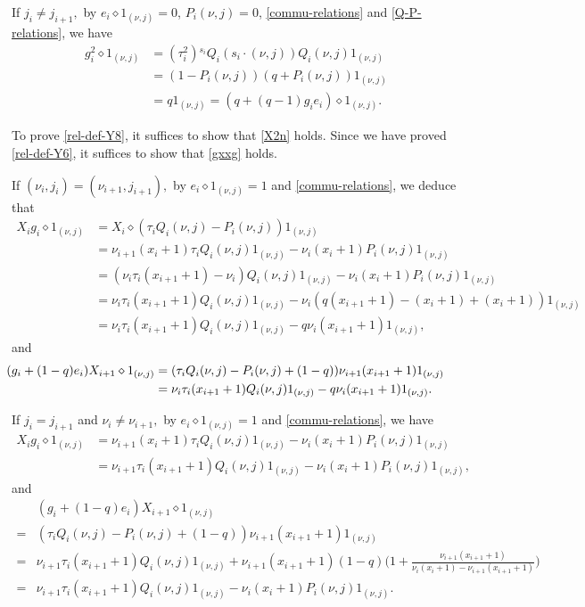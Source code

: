 \documentclass[11pt, reqno]{amsart} \textwidth=14.9cm \oddsidemargin=1cm \evensidemargin=1cm
\theoremstyle{definition}
\numberwithin{equation}{section}
\begin{document}
If $j_{i}\neq j_{i+1},$ by $e_{i}\diamond 1_{(\nu, j)}=0$, $P_{i}(\nu, j)=0$, \eqref{commu-relations} and \eqref{Q-P-relations}, we have
\begin{align*}
g_{i}^{2}\diamond 1_{(\nu, j)}&=(\tau_{i}^{2}){}^{s_{i}}Q_{i}(s_{i}\cdot(\nu, j))Q_{i}(\nu, j)1_{(\nu, j)}\\
&=(1-P_{i}(\nu, j))(q+P_{i}(\nu, j))1_{(\nu, j)}\\
&=q1_{(\nu, j)}=(q+(q-1)g_{i}e_{i})\diamond 1_{(\nu, j)}.
\end{align*}

To prove \eqref{rel-def-Y8}, it suffices to show that \eqref{X2n} holds. Since we have proved \eqref{rel-def-Y6}, it suffices to show that \eqref{gxxg} holds.

If $(\nu_{i}, j_{i})=(\nu_{i+1}, j_{i+1}),$ by $e_{i}\diamond 1_{(\nu, j)}=1$ and \eqref{commu-relations}, we deduce that
\begin{align*}
X_{i}g_{i}\diamond 1_{(\nu, j)}&=X_{i}\diamond (\tau_{i}Q_{i}(\nu, j)-P_{i}(\nu, j))1_{(\nu, j)}\\
&=\nu_{i+1}(x_{i}+1)\tau_{i}Q_{i}(\nu, j)1_{(\nu, j)}-\nu_{i}(x_{i}+1)P_{i}(\nu, j)1_{(\nu, j)}\\
&=(\nu_{i}\tau_{i}(x_{i+1}+1)-\nu_{i})Q_{i}(\nu, j)1_{(\nu, j)}-\nu_{i}(x_{i}+1)P_{i}(\nu, j)1_{(\nu, j)}\\
&=\nu_{i}\tau_{i}(x_{i+1}+1)Q_{i}(\nu, j)1_{(\nu, j)}-\nu_{i}(q(x_{i+1}+1)-(x_{i}+1)+(x_{i}+1))1_{(\nu, j)}\\
&=\nu_{i}\tau_{i}(x_{i+1}+1)Q_{i}(\nu, j)1_{(\nu, j)}-q\nu_{i}(x_{i+1}+1)1_{(\nu, j)},
\end{align*}
and
\begin{align*}
\hspace{-0.6cm}(g_{i}+(1-q)e_{i})X_{i+1}\diamond 1_{(\nu, j)}&=(\tau_{i}Q_{i}(\nu, j)-P_{i}(\nu, j)+(1-q))\nu_{i+1}(x_{i+1}+1)1_{(\nu, j)}\\
&=\nu_{i}\tau_{i}(x_{i+1}+1)Q_{i}(\nu, j)1_{(\nu, j)}-q\nu_{i}(x_{i+1}+1)1_{(\nu, j)}.
\end{align*}


If $j_{i}=j_{i+1}$ and $\nu_{i}\neq \nu_{i+1},$ by $e_{i}\diamond 1_{(\nu, j)}=1$ and \eqref{commu-relations}, we have
\begin{align*}
X_{i}g_{i}\diamond 1_{(\nu, j)}&=\nu_{i+1}(x_{i}+1)\tau_{i}Q_{i}(\nu, j)1_{(\nu, j)}-\nu_{i}(x_{i}+1)P_{i}(\nu, j)1_{(\nu, j)}\\
&=\nu_{i+1}\tau_{i}(x_{i+1}+1)Q_{i}(\nu, j)1_{(\nu, j)}-\nu_{i}(x_{i}+1)P_{i}(\nu, j)1_{(\nu, j)},
\end{align*}
and
\begin{align*}
&(g_{i}+(1-q)e_{i})X_{i+1}\diamond 1_{(\nu, j)}\\=&(\tau_{i}Q_{i}(\nu, j)-P_{i}(\nu, j)+(1-q))\nu_{i+1}(x_{i+1}+1)1_{(\nu, j)}\\
=&\nu_{i+1}\tau_{i}(x_{i+1}+1)Q_{i}(\nu, j)1_{(\nu, j)}+\nu_{i+1}(x_{i+1}+1)(1-q)\big(1+\frac{\nu_{i+1}(x_{i+1}+1)}{\nu_{i}(x_{i}+1)-\nu_{i+1}(x_{i+1}+1)}\big)\\
=&\nu_{i+1}\tau_{i}(x_{i+1}+1)Q_{i}(\nu, j)1_{(\nu, j)}-\nu_{i}(x_{i}+1)P_{i}(\nu, j)1_{(\nu, j)}.
\end{align*}
\end{document}
